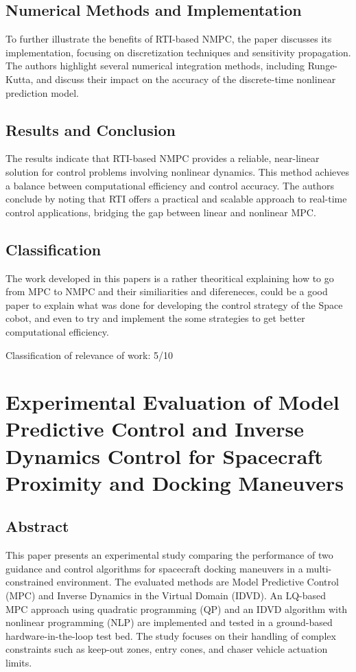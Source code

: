 \documentclass[a4paper,12pt]{article}
\begin{document}
\subsection{Numerical Methods and Implementation}
To further illustrate the benefits of RTI-based NMPC, the paper discusses its implementation, focusing on discretization techniques and sensitivity propagation. The authors highlight several numerical integration methods, including Runge-Kutta, and discuss their impact on the accuracy of the discrete-time nonlinear prediction model.

\subsection{Results and Conclusion}
The results indicate that RTI-based NMPC provides a reliable, near-linear solution for control problems involving nonlinear dynamics. This method achieves a balance between computational efficiency and control accuracy. The authors conclude by noting that RTI offers a practical and scalable approach to real-time control applications, bridging the gap between linear and nonlinear MPC.

\subsection {Classification}

The work developed in this papers is a rather theoritical explaining how to go from MPC to NMPC and their similiarities and difereneces, could be a good paper to explain what was done for developing the control strategy of the Space cobot, and even to try and implement the some strategies to get better computational efficiency.

Classification of relevance of work: 5/10

\section{Experimental Evaluation of Model Predictive Control and Inverse Dynamics Control for Spacecraft Proximity and Docking Maneuvers}


\subsection{Abstract}
This paper presents an experimental study comparing the performance of two guidance and control algorithms for spacecraft docking maneuvers in a multi-constrained environment. The evaluated methods are Model Predictive Control (MPC) and Inverse Dynamics in the Virtual Domain (IDVD). An LQ-based MPC approach using quadratic programming (QP) and an IDVD algorithm with nonlinear programming (NLP) are implemented and tested in a ground-based hardware-in-the-loop test bed. The study focuses on their handling of complex constraints such as keep-out zones, entry cones, and chaser vehicle actuation limits.
\end{document}
